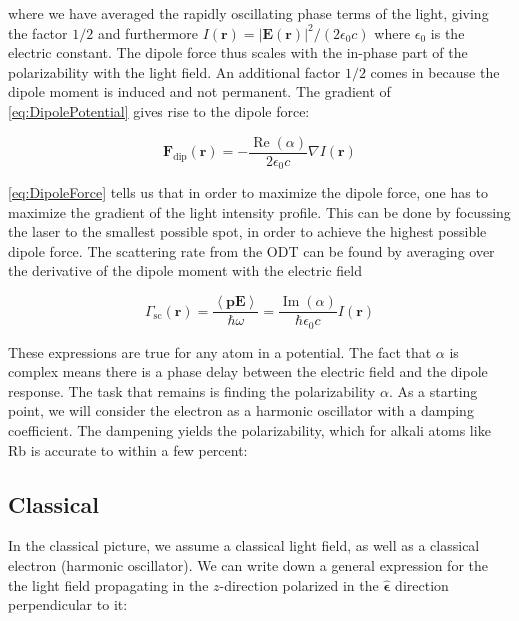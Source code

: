 where we have averaged the rapidly oscillating phase terms of the light, giving the factor $1/2$ and furthermore $I(\mathbf{r}) = |\mathbf{E}(\mathbf{r})|^2/(2\epsilon_0 c)$ where $\epsilon_0$ is the electric constant. The dipole force thus scales with the in-phase part of the polarizability with the light field. An additional factor $1/2$ comes in because the dipole moment is induced and not permanent. The gradient of \cref{eq:DipolePotential} gives rise to the dipole force:

\begin{equation}\label{eq:DipoleForce}
	\mathbf{F}_{\text{dip}}(\mathbf{r}) = - \frac{\operatorname{Re}(\alpha)}{2\epsilon_0c}\nabla I(\mathbf{r})
\end{equation}

\cref{eq:DipoleForce} tells us that in order to maximize the dipole force, one has to maximize the gradient of the light intensity profile. This can be done by focussing the laser to the smallest possible spot, in order to achieve the highest possible dipole force. The scattering rate from the ODT can be found by averaging over the derivative of the dipole moment with the electric field 

\begin{equation}\label{eq:ScatteringRate}
	\Gamma_{\text{sc}}(\mathbf{r}) = \frac{\left\langle \mathbf{p} \mathbf{E} \right\rangle}{\hbar \omega}
	 = \frac{\operatorname{Im}(\alpha)}{\hbar \epsilon_0 c} I(\mathbf{r}) 
\end{equation}

These expressions are true for any atom in a potential. The fact that $\alpha$ is complex means there is a phase delay between the electric field and the dipole response. The task that remains is finding the polarizability $\alpha$. As a starting point, we will consider the electron as a harmonic oscillator with a damping coefficient. The dampening yields the polarizability, which for alkali atoms like Rb is accurate to within a few percent: 

\subsection{Classical}

In the classical picture, we assume a classical light field, as well as a classical electron (harmonic oscillator). We can write down a general expression for the the light field propagating in the $z$-direction polarized in the $\bm{\hat{\epsilon}}$ direction perpendicular to it:


